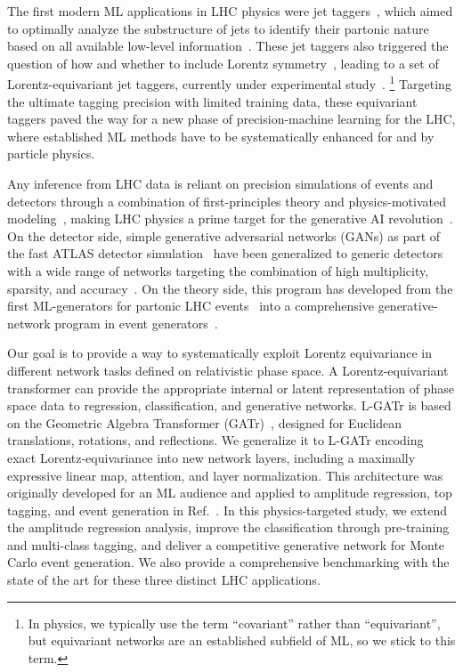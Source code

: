 \documentclass[submission, Phys]{SciPost}
\begin{document}
The first modern ML applications in LHC physics were jet taggers~\cite{Kasieczka:2019dbj,Nachman:2022emq}, which aimed to optimally analyze the substructure of jets to identify their partonic nature~\cite{Cogan:2014oua,Baldi:2014kfa} based on all available low-level information~\cite{Cogan:2014oua,Baldi:2014kfa,deOliveira:2015xxd,Gallicchio:2010sw,Kasieczka:2017nvn}.
%
These jet taggers also triggered the question of how and whether to include Lorentz symmetry~\cite{Butter:2017cot}, leading to a set of Lorentz-equivariant jet taggers, currently under experimental study~\cite{Gong:2022lye,Qiu:2022xvr,Bogatskiy:2022czk,Qiu:2023ihi,ruhe2023clifford}.%
%
\footnote{In physics, we typically use the term ``covariant'' rather than ``equivariant'', but equivariant networks are an established subfield of ML, so we stick to this term.}
%
Targeting the ultimate tagging precision with limited training data, these equivariant taggers paved the way for a new phase of precision-machine learning for the LHC, where established ML methods have to be systematically enhanced for and by particle physics.

Any inference from LHC data is reliant on precision simulations of events and detectors through a combination of first-principles theory and physics-motivated modeling~\cite{Butter:2022rso,Campbell:2022qmc}, making LHC physics a prime target for the generative AI revolution~\cite{Paganini:2017dwg}. On the detector side, simple generative adversarial networks (GANs) as part of the fast ATLAS detector simulation~\cite{Ghosh:2020kkt} have been generalized to generic detectors~\cite{Buhmann:2020pmy,Buhmann:2023kdg} with a wide range of networks targeting the combination of high multiplicity, sparsity, and accuracy~\cite{Krause:2024avx}.
On the theory side, this program has developed from the first ML-generators for partonic LHC events~\cite{Otten:2019hhl,Hashemi:2019fkn,Butter:2019cae} into a comprehensive generative-network program in event generators~\cite{Heimel:2022wyj,Ghosh:2022zdz,Bierlich:2023zzd,Janssen:2023lgz,Chan:2023ume,Heimel:2023ngj,Heimel:2024wph,Bierlich:2024xzg}.

Our goal is to provide a way to systematically exploit Lorentz equivariance in different network tasks defined on relativistic phase space. A Lorentz-equivariant transformer can provide the appropriate internal or latent representation of phase space data to regression, classification, and generative networks. L-GATr is based on the Geometric Algebra Transformer (GATr)~\cite{brehmer2023geometric, de2023euclidean}, designed for Euclidean translations, rotations, and reflections. We generalize it to L-GATr encoding exact Lorentz-equivariance into new network layers, including a maximally expressive linear map, attention, and layer normalization. This architecture was originally developed for an ML audience and applied to amplitude regression, top tagging, and event generation in Ref.~\cite{Spinner:2024hjm}. In this physics-targeted study, we extend the amplitude regression analysis, improve the classification through pre-training and multi-class tagging, and deliver a competitive generative network for Monte Carlo event generation. We also provide a comprehensive benchmarking with the state of the art for these three distinct LHC applications.
\end{document}
